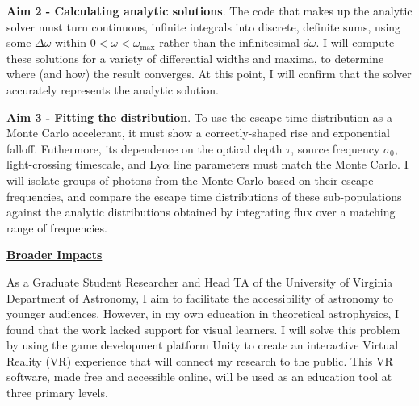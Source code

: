 \documentclass[11pt]{article}
\begin{document}
\noindent \textbf{Aim 2 - Calculating analytic solutions}. The code that makes up the analytic solver must turn continuous, infinite integrals into discrete, definite sums, using some $\Delta \omega$ within $0 < \omega < \omega_{\mathrm{max}}$ rather than the infinitesimal $d\omega$. I will compute these solutions for a variety of differential widths and maxima, to determine where (and how) the result converges. At this point, I will confirm that the solver accurately represents the analytic solution. 

\noindent \textbf{Aim 3 - Fitting the distribution}. To use the escape time distribution as a Monte Carlo accelerant, it must show a correctly-shaped rise and exponential falloff. Futhermore, its dependence on the optical depth $\tau$, source frequency $\sigma_0$, light-crossing timescale, and Ly$\alpha$ line parameters must match the Monte Carlo. I will isolate groups of photons from the Monte Carlo based on their escape frequencies, and compare the escape time distributions of these sub-populations against the analytic distributions obtained by integrating flux over a matching range of frequencies.

\thispagestyle{empty}

\noindent \textbf{\underline{Broader Impacts}} 

As a Graduate Student Researcher and Head TA of the University of Virginia Department of Astronomy, I aim to facilitate the accessibility of astronomy to younger audiences. However, in my own education in theoretical astrophysics, I found that the work lacked support for visual learners. I will solve this problem by using the game development platform Unity to create an interactive Virtual Reality (VR) experience that will connect my research to the public. This VR software, made free and accessible online, will be used as an education tool at three primary levels.
\end{document}
